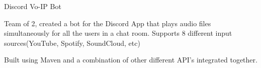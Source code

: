 \cventry
    {Discord Vo-IP Bot} %
    {} %
    {} %
    {} %
    {\begin{cvitems}
        \item{Team of 2, created a bot for the Discord App that plays audio files simultaneously for all the users in a chat room. Supports 8 different input sources(YouTube, Spotify, SoundCloud, etc)}
        \item{Built using Maven and a combination of other different API’s integrated together.}
    \end{cvitems}}